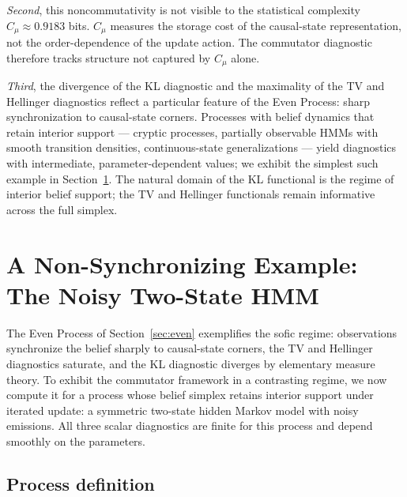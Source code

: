 \documentclass[11pt,a4paper]{article}
\theoremstyle{plain}
\theoremstyle{definition}
\theoremstyle{remark}
\begin{document}
\emph{Second}, this noncommutativity is not visible to the statistical complexity $C_\mu \approx 0.9183$ bits. $C_\mu$ measures the storage cost of the causal-state representation, not the order-dependence of the update action. The commutator diagnostic therefore tracks structure not captured by $C_\mu$ alone.

\emph{Third}, the divergence of the KL diagnostic and the maximality of the TV and Hellinger diagnostics reflect a particular feature of the Even Process: sharp synchronization to causal-state corners. Processes with belief dynamics that retain interior support --- cryptic processes, partially observable HMMs with smooth transition densities, continuous-state generalizations --- yield diagnostics with intermediate, parameter-dependent values; we exhibit the simplest such example in Section~\ref{sec:hmm}. The natural domain of the KL functional is the regime of interior belief support; the TV and Hellinger functionals remain informative across the full simplex.

\section{A Non-Synchronizing Example: The Noisy Two-State HMM}
\label{sec:hmm}

The Even Process of Section~\ref{sec:even} exemplifies the sofic regime: observations synchronize the belief sharply to causal-state corners, the TV and Hellinger diagnostics saturate, and the KL diagnostic diverges by elementary measure theory. To exhibit the commutator framework in a contrasting regime, we now compute it for a process whose belief simplex retains interior support under iterated update: a symmetric two-state hidden Markov model with noisy emissions. All three scalar diagnostics are finite for this process and depend smoothly on the parameters.

\subsection{Process definition}
\end{document}
